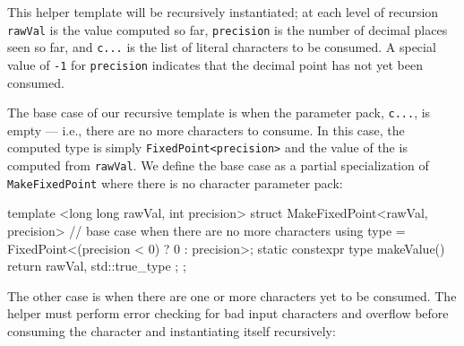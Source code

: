 \begin{emcppslisting}[emcppsbatch=e17]
namespace literals  // fixed-point literals defined in this namespace
{

template <long long rawVal, int precision, char... c>
struct MakeFixedPoint;
\end{emcppslisting}
    
\noindent This helper template will be recursively instantiated; at each level of
recursion \lstinline!rawVal! is the value computed so far,
\lstinline!precision! is the number of decimal places seen so far, and
\lstinline!c...! is the list of literal characters to be consumed. A
special value of \lstinline!-1! for \lstinline!precision! indicates that the decimal
point has not yet been consumed.

The base case of our recursive template is when the parameter pack,
\lstinline!c...!, is empty --- i.e., there are no more characters to
consume. In this case, the computed type is simply
\lstinline!FixedPoint<precision>! and the value of the  is computed from \lstinline!rawVal!. We define the base case as a
partial specialization of \lstinline!MakeFixedPoint! where there is no
character parameter pack:

\begin{emcppslisting}[emcppsbatch=e17]
template <long long rawVal, int precision>
struct MakeFixedPoint<rawVal, precision> {
    // base case when there are no more characters
    using type = FixedPoint<(precision < 0) ? 0 : precision>;
    static constexpr type makeValue() { return { rawVal, std::true_type{} }; }
};
\end{emcppslisting}
    
\noindent The other case is when there are one or more characters yet to be
consumed. The helper must perform error checking for bad input
characters and overflow before consuming the character and instantiating
itself recursively:

